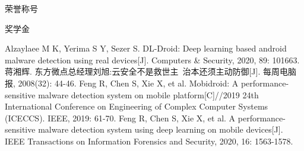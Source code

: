 \documentclass[14pt]{jnuthesis}
\begin{document}
\begin{enumerate}[{[}1{]}]
	\item 荣誉称号
	\item 奖学金
\end{enumerate}



\begin{thebibliography}{1}
 Alzaylaee M K, Yerima S Y, Sezer S. DL-Droid: Deep learning based android malware detection using real devices[J]. Computers \& Security, 2020, 89: 101663. %
 蒋湘辉. 东方微点总经理刘旭:云安全不是救世主\ 治本还须主动防御[J]. 每周电脑报, 2008(32): 44-46. %
 Feng R, Chen S, Xie X, et al. Mobidroid: A performance-sensitive malware detection system on mobile platform[C]//2019 24th International Conference on Engineering of Complex Computer Systems (ICECCS). IEEE, 2019: 61-70. 
 Feng R, Chen S, Xie X, et al. A performance-sensitive malware detection system using deep learning on mobile devices[J]. IEEE Transactions on Information Forensics and Security, 2020, 16: 1563-1578. 
\end{thebibliography}
\end{document}
